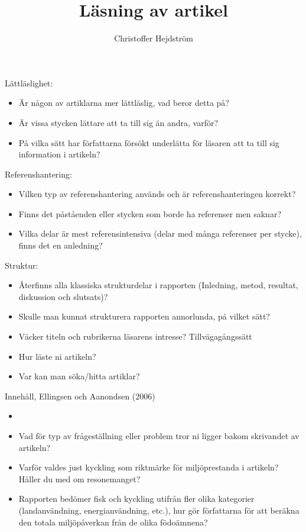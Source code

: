 \documentclass[12pt,a4paper]{article}
\author{Christoffer Hejdström}
\title{Läsning av artikel}
\begin{document}
\maketitle
\newpage
{}

Lättläslighet:
\begin{itemize}
\item Är någon av artiklarna mer lättläslig, vad beror detta på?
\item Är vissa stycken lättare att ta till sig än andra, varför?
\item På vilka sätt har författarna försökt underlätta för läsaren att ta till sig information i artikeln?
\end{itemize}

Referenshantering:
\begin{itemize}
\item Vilken typ av referenshantering används och är referenshanteringen korrekt?
\item Finns det påståenden eller stycken som borde ha referenser men saknar?
\item Vilka delar är mest referensintensiva (delar med många referenser per stycke), finns det en
anledning?
\end{itemize}


Struktur:
\begin{itemize}
\item Återfinns alla klassiska strukturdelar i rapporten (Inledning, metod, resultat, diskussion och slutsats)?
\item Skulle man kunnat strukturera rapporten annorlunda, på vilket sätt?
\item Väcker titeln och rubrikerna läsarens intresse?
Tillvägagångssätt
\item Hur läste ni artikeln?
\item Var kan man söka/hitta artiklar?
\end{itemize}

Innehåll, Ellingsen och Aanondsen (2006)
\begin{itemize}
\item \item Vad för typ av frågeställning eller problem tror ni ligger bakom skrivandet av artikeln?
\item Varför valdes just kyckling som riktmärke för miljöprestanda i artikeln? Håller du med om
resonemanget?
\item Rapporten bedömer fisk och kyckling utifrån fler olika kategorier (landanvändning,
energianvändning, etc.), hur gör författarna för att beräkna den totala miljöpåverkan från de olika
födoämnena?
\end{itemize}
\end{document}
